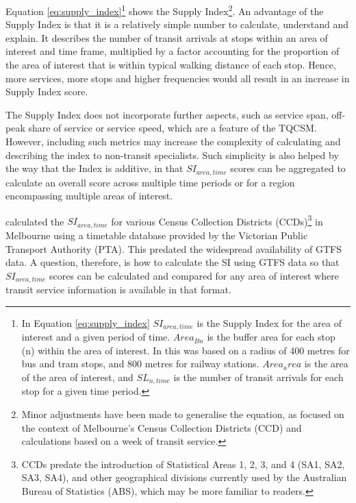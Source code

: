 \documentclass[]{tufte-book}
\begin{document}
Equation \ref{eq:supply_index}\footnote{In Equation
  \ref{eq:supply_index} \(SI_{area, time}\) is the Supply Index for the
  area of interest and a given period of time. \(Area_{Bn}\) is the
  buffer area for each stop (n) within the area of interest. In
  \citet{currie2007identifying} this was based on a radius of 400 metres
  for bus and tram stops, and 800 metres for railway stations.
  \(Area_area\) is the area of the area of interest, and \(SL_{n,time}\)
  is the number of transit arrivals for each stop for a given time
  period.} shows the Supply Index\footnote{Minor adjustments have been
  made to generalise the equation, as \citet{currie2007identifying}
  focused on the context of Melbourne's Census Collection Districts
  (CCD) and calculations based on a week of transit service.}. An
advantage of the Supply Index is that it is a relatively simple number
to calculate, understand and explain. It describes the number of transit
arrivals at stops within an area of interest and time frame, multiplied
by a factor accounting for the proportion of the area of interest that
is within typical walking distance of each stop. Hence, more services,
more stops and higher frequencies would all result in an increase in
Supply Index score.

The Supply Index does not incorporate further aspects, such as service
span, off-peak share of service or service speed, which are a feature of
the TQCSM. However, including such metrics may increase the complexity
of calculating and describing the index to non-transit specialists. Such
simplicity is also helped by the way that the Index is additive, in that
\(SI_{area, time}\) scores can be aggregated to calculate an overall
score across multiple time periods or for a region encompassing multiple
areas of interest.

\citet{currie2007identifying} calculated the \(SI_{area, time}\) for
various Census Collection Districts (CCDs)\footnote{CCDs predate the
  introduction of Statistical Areas 1, 2, 3, and 4 (SA1, SA2, SA3, SA4),
  and other geographical divisions currently used by the Australian
  Bureau of Statistics (ABS), which may be more familiar to readers.} in
Melbourne using a timetable database provided by the Victorian Public
Transport Authority (PTA). This predated the widespread availability of
GTFS data. A question, therefore, is how to calculate the SI using GTFS
data so that \(SI_{area, time}\) scores can be calculated and compared
for any area of interest where transit service information is available
in that format.
\end{document}
